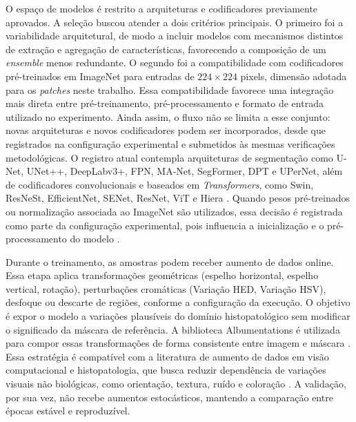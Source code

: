 O espaço de modelos é restrito a arquiteturas e codificadores previamente
aprovados. A seleção buscou atender a dois critérios principais. O primeiro foi
a variabilidade arquitetural, de modo a incluir modelos com mecanismos distintos
de extração e agregação de características, favorecendo a composição de um
\textit{ensemble} menos redundante. O segundo foi a compatibilidade com
codificadores pré-treinados em ImageNet para entradas de $224 \times 224$
pixels, dimensão adotada para os \textit{patches} neste trabalho. Essa
compatibilidade favorece uma integração mais direta entre pré-treinamento,
pré-processamento e formato de entrada utilizado no experimento. Ainda assim, o
fluxo não se limita a esse conjunto: novas arquiteturas e novos codificadores
podem ser incorporados, desde que registrados na configuração experimental e
submetidos às mesmas verificações metodológicas. O registro atual contempla
arquiteturas de segmentação como U-Net, UNet++, DeepLabv3+, FPN, MA-Net,
SegFormer, DPT e UPerNet, além de codificadores convolucionais e baseados em
\textit{Transformers}, como Swin, ResNeSt, EfficientNet, SENet, ResNet, ViT e
Hiera
\cite{ronneberger2015unet,zhou2020unetpp,chen2018deeplabv3plus,lin2017fpn,
fan2020manet,xie2021segformer,ranftl2021dpt,xiao2018upernet,liu2021swin,
zhang2022resnest,tan2019efficientnet,hu2018senet,he2016resnet,
dosovitskiy2021vit,ryali2023hiera}. Quando pesos pré-treinados ou normalização
associada ao ImageNet são utilizados, essa decisão é registrada como parte da
configuração experimental, pois influencia a inicialização e o pré-processamento
do modelo \cite{russakovsky2015imagenet}.

Durante o treinamento, as amostras podem receber aumento de dados online. Essa
etapa aplica transformações geométricas (espelho horizontal, espelho vertical, rotação), perturbações cromáticas (Variação HED, Variação HSV), desfoque ou descarte de regiões, conforme a configuração da
execução. O objetivo é expor o modelo a variações plausíveis do domínio
histopatológico sem modificar o significado da máscara de referência. A
biblioteca Albumentations é utilizada para compor essas transformações de forma
consistente entre imagem e máscara \cite{buslaev2020albumentations}. Essa
estratégia é compatível com a literatura de aumento de dados em visão
computacional e histopatologia, que busca reduzir dependência de variações
visuais não biológicas, como orientação, textura, ruído e coloração
\cite{dossantos2023augmentation,tellez2019augmentation,shorten2019survey,
zhong2020random}. A validação, por sua vez, não recebe aumentos estocásticos,
mantendo a comparação entre épocas estável e reproduzível.

